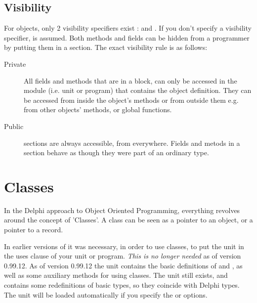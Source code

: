 \documentclass{report}
\begin{document}
\section{Visibility}
For objects, only 2 visibility specifiers exist :  and
. If you don't specify a visibility specifier, 
is assumed.
Both methods and fields can be hidden from a programmer by putting them
in a  section. The exact visibility rule is as follows:
\begin{description}
\item [Private\ ] All fields and methods that are in a  block,
can  only be accessed in the module (i.e. unit or program) that contains
the object definition.
They can be accessed from inside the object's methods or from outside them
e.g. from other objects' methods, or global functions.
\item [Public\ ] sections are always accessible, from everywhere.
Fields and metods in a  section behave as though they were part
of an ordinary  type.
\end{description}



\chapter{Classes}
\label{ch:Classes}
In the Delphi approach to Object Oriented Programming, everything revolves
around  the concept of 'Classes'.  A class can be seen as a pointer to an
object, or a pointer to a record.

\begin{remark}
In earlier versions of \fpc it was necessary, in order to use classes, 
to put the  unit in the uses clause of your unit or program. 
{\em This is no longer needed} as of version 0.99.12. As of version 0.99.12 
the  unit contains the basic  definitions of  
and  , as well as some auxiliary methods for using classes.
The  unit still exists, and contains some redefinitions of
basic types, so they coincide with Delphi types. The unit will be loaded
automatically if you specify the  or  options.
\end{remark}

\end{document}
